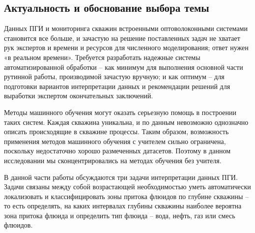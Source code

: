 \subsection{Актуальность и обоснование выбора темы}
\par
Данных ПГИ и мониторинга скважин встроенными оптоволоконными системами становится все больше, и зачастую на решение поставленных задач не хватает рук экспертов и времени и ресурсов для численного моделирования; ответ нужен «в реальном времени». Требуется разработать надежные системы автоматизированной обработки – как минимум для выполнения основной части рутинной работы, производимой зачастую вручную; и как оптимум – для подготовки вариантов интерпретации данных и рекомендации решений для выработки экспертом окончательных заключений.
\par
Методы машинного обучения могут оказать серьезную помощь в построении таких систем. Каждая скважина уникальна, и по данным невозможно однозначно описать происходящие в скважине процессы. Таким образом, возможность применения методов машинного обучения с учителем сильно ограничена, поскольку недостаточно хорошо размеченных датасетов. Поэтому в данном исследовании мы сконцентрировались на методах обучения без учителя.
\par
В данной части работы обсуждаются три задачи интерпретации данных ПГИ. Задачи связаны между собой возрастающей необходимостью уметь автоматически локализовать и классифицировать зоны притока флюидов по глубине скважины – то есть определять, на каких интервалах глубины скважины наиболее вероятна зона притока флюида и определить тип флюида – вода, нефть, газ или смесь флюидов.
